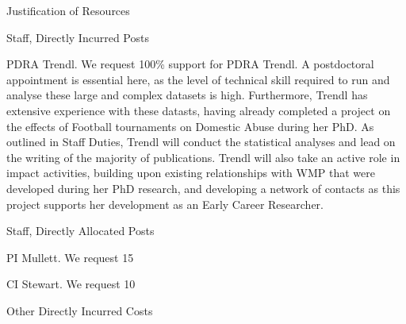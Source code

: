 Justification of Resources

Staff, Directly Incurred Posts

PDRA Trendl. We request 100\% support for PDRA Trendl. A postdoctoral appointment is essential here, as the level of technical skill required to run and analyse these large and complex datasets is high. Furthermore, Trendl has extensive experience with these datasts, having already completed a project on the effects of Football tournaments on Domestic Abuse during her PhD. As outlined in Staff Duties, Trendl will conduct the statistical analyses and lead on the writing of the majority of publications. Trendl will also take an active role in impact activities, building upon existing relationships with WMP that were developed during her PhD research, and developing a network of contacts as this project supports her development as an Early Career Researcher. 


Staff, Directly Allocated Posts

PI Mullett. We request 15%

CI Stewart. We request 10%


Other Directly Incurred Costs

